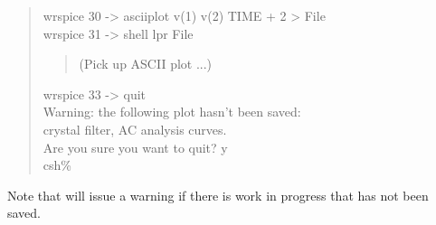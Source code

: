 \begin{quote}
{ wrspice 30 -> asciiplot v(1) v(2) TIME + 2 > File\\
 wrspice 31 -> shell lpr File\\
 \begin{quote}
  {\rm (Pick up ASCII plot ...)}
 \end{quote}

 wrspice 33 -> quit\\
 Warning: the following plot hasn't been saved:\\
         crystal filter, AC analysis curves.\\
 
 Are you sure you want to quit? y\\
 
 csh\%\\
}
\end{quote}

Note that {\WRspice} will issue a warning if there is work in progress
that has not been saved.

